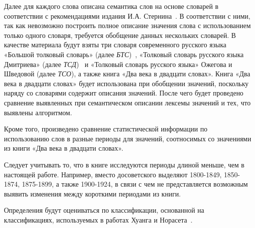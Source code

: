 \documentclass[LI,VKR]{HSEUniversity}
\begin{document}
Далее для каждого слова описана семантика слов на основе словарей в соответствии
с рекомендациями издания И.А. Стернина~\cite{SemanticDefinitionsAndAnalysis}.
В соответствии с ними, так как невозможно построить полное описание значения слова
с использованием только одного словаря, требуется обобщение данных нескольких словарей.
В качестве материала будут взяты три словаря современного русского языка
«Большой толковый словарь» (далее \textit{БТС})~\cite{TolkovyKuznetsov},
«Толковый словарь русского языка Дмитриева» (далее \textit{ТСД})~\cite{TolkovyDmitriev} и
«Толковый словарь русского языка» Ожегова и Шведовой (далее \textit{ТСО}),
а также книга «Два века в двадцати словах».
Книга «Два века в двадцати словах» будет использована при обобщении значений,
поскольку наряду со словарями содержит описания значений.
После чего будет проведено сравнение выявленных при семантическом описании лексемы
значений и тех, что выявлены алгоритмом.

Кроме того, произведено сравнение статистической информации по использованию слов
в разные периоды для значений, соотносимых со значениями из книги
«Два века в двадцати словах».

Следует учитывать то, что в книге исследуются периоды длиной меньше, чем в настоящей работе.
Например, вместо досоветского выделяют 1800-1849, 1850-1874, 1875-1899, а также 1900-1924,
в связи с чем не представляется возможным выявить изменения между короткими периодами из книги.

Определения будут оцениваться по классификации, основанной на классификациях, используемых
в работах Хуанга и Норасета~\cite{huang-etal-2021-definition, noraset2016definition}.
\end{document}
